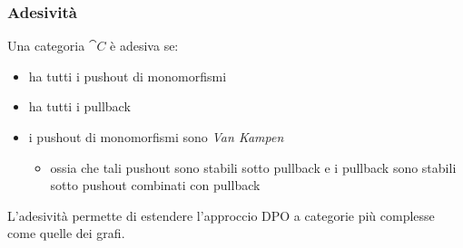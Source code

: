 \documentclass[8pt]{beamer}
\begin{document}
\begin{frame}[fragile]\frametitle{Adesività}


	\iffalse
	\begin{wrapfigure}{l}{0.4\textwidth}
                \[
                \begin{tikzcd}[row sep=11, column sep=11]
                        & {A'} && {B'} \\
                        {C'} && {D'} \\
                        & A && B \\
                        C && D
                        \arrow["{f'}", from=1-2, to=1-4]
                        \arrow["{m'}"', from=1-2, to=2-1]
                        \arrow["a"'{pos=0.7}, from=1-2, to=3-2]
                        \arrow["{n'}"', from=1-4, to=2-3]
                        \arrow["b", from=1-4, to=3-4]
                        \arrow["{g'}"{pos=0.7}, from=2-1, to=2-3, crossing over]
                        \arrow["c"', from=2-1, to=4-1]
                        \arrow["f"'{pos=0.3}, from=3-2, to=3-4]
                        \arrow["d"{pos=0.3}, from=2-3, to=4-3, crossing over]
                        \arrow["m", from=3-2, to=4-1]
                        \arrow["n", from=3-4, to=4-3]
                        \arrow["g"', from=4-1, to=4-3]
                    \end{tikzcd}
            \]
        \end{wrapfigure}
	\fi

	Una categoria $\cat C$ è adesiva se:
	\begin{itemize}
		\item ha tutti i pushout di monomorfismi
		\item ha tutti i pullback
		\item i pushout di monomorfismi sono \emph{Van Kampen}
			\begin{itemize}
				\item ossia che tali pushout sono stabili sotto pullback e i pullback sono stabili sotto pushout combinati con pullback
			\end{itemize}
	\end{itemize}

	\smallskip

	L'adesività permette di estendere l'approccio DPO a categorie più complesse come quelle dei grafi.

	\smallskip
	
	\smallskip
\begin{figure}%
    \centering
    \qquad
    \label{fig:example}%
\end{figure}

\end{frame}
\end{document}
